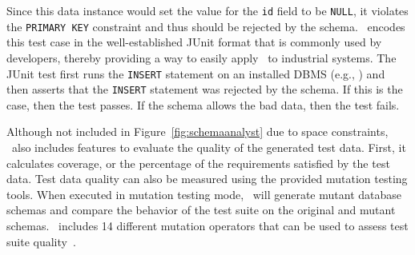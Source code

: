 
\vspace{1ex}
\noindent {}
\vspace{1ex}


Since this data instance would set the value for the \texttt{id} field to be \texttt{NULL}, it violates the
\texttt{PRIMARY KEY} constraint and thus should be rejected by the schema. \sa~encodes this test case in the
well-established JUnit format that is commonly used by developers, thereby providing a way to easily apply \sa~to
industrial systems.  The JUnit test first runs the \texttt{INSERT} statement on an installed DBMS (e.g., \sqlite) and
then asserts that the \texttt{INSERT} statement was rejected by the schema. If this is the case, then the test passes.
If the schema allows the bad data, then the test fails.


Although not included in Figure~\ref{fig:schemaanalyst} due to space constraints, \sa~also includes features to evaluate
the quality of the generated test data. First, it calculates coverage, or the percentage of the requirements satisfied
by the test data.  Test data quality can also be measured using the provided mutation testing tools. When executed in
mutation testing mode, \sa~will generate mutant database schemas and compare the behavior of the test suite on the
original and mutant schemas. \sa~includes 14 different mutation operators that can be used to assess test suite
quality~\cite{wright2015mutation}.



